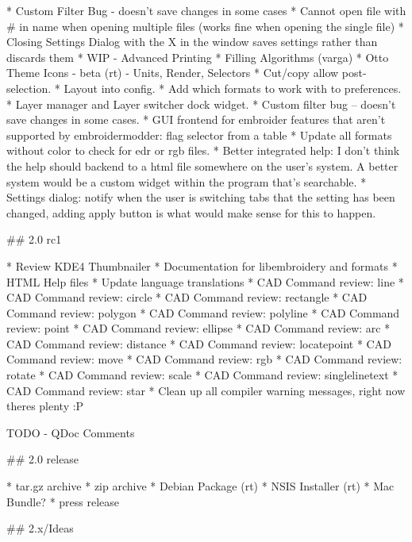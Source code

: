* Custom Filter Bug - doesn't save changes in some cases
* Cannot open file with \# in name when opening multiple files (works fine when opening the single file)
* Closing Settings Dialog with the X in the window saves settings rather than discards them
* WIP - Advanced Printing
* Filling Algorithms (varga)
* Otto Theme Icons - beta (rt) - Units, Render, Selectors
* Cut/copy allow post-selection.
* Layout into config.
* Add which formats to work with to preferences.
* Layer manager and Layer switcher dock widget.
* Custom filter bug -- doesn't save changes in some cases.
* GUI frontend for embroider features that aren't supported by embroidermodder: flag selector from a table
* Update all formats without color to check for edr or rgb files.
* Better integrated help: I don't think the help should backend to a html file somewhere on the user's system. A better system would be a custom widget within the program that's searchable.
* Settings dialog: notify when the user is switching tabs that the setting has been changed, adding apply button is what would make sense for this to happen.

## 2.0 rc1

* Review KDE4 Thumbnailer
* Documentation for libembroidery and formats
* HTML Help files
* Update language translations
* CAD Command review: line
* CAD Command review: circle
* CAD Command review: rectangle
* CAD Command review: polygon
* CAD Command review: polyline
* CAD Command review: point
* CAD Command review: ellipse
* CAD Command review: arc
* CAD Command review: distance
* CAD Command review: locatepoint
* CAD Command review: move
* CAD Command review: rgb
* CAD Command review: rotate
* CAD Command review: scale
* CAD Command review: singlelinetext
* CAD Command review: star
* Clean up all compiler warning messages, right now theres plenty :P

TODO - QDoc Comments

## 2.0 release

* tar.gz archive
* zip archive
* Debian Package (rt)
* NSIS Installer (rt)
* Mac Bundle?
* press release

## 2.x/Ideas

